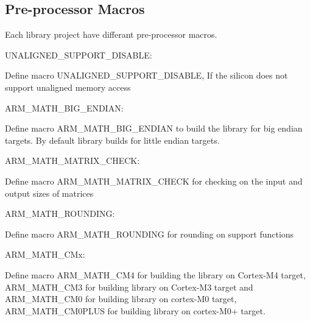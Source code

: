 \subsection*{Pre-\/processor Macros }

Each library project have differant pre-\/processor macros.


\begin{DoxyItemize}
\item U\+N\+A\+L\+I\+G\+N\+E\+D\+\_\+\+S\+U\+P\+P\+O\+R\+T\+\_\+\+D\+I\+S\+A\+B\+LE\+:
\end{DoxyItemize}

Define macro U\+N\+A\+L\+I\+G\+N\+E\+D\+\_\+\+S\+U\+P\+P\+O\+R\+T\+\_\+\+D\+I\+S\+A\+B\+LE, If the silicon does not support unaligned memory access


\begin{DoxyItemize}
\item A\+R\+M\+\_\+\+M\+A\+T\+H\+\_\+\+B\+I\+G\+\_\+\+E\+N\+D\+I\+AN\+:
\end{DoxyItemize}

Define macro A\+R\+M\+\_\+\+M\+A\+T\+H\+\_\+\+B\+I\+G\+\_\+\+E\+N\+D\+I\+AN to build the library for big endian targets. By default library builds for little endian targets.


\begin{DoxyItemize}
\item A\+R\+M\+\_\+\+M\+A\+T\+H\+\_\+\+M\+A\+T\+R\+I\+X\+\_\+\+C\+H\+E\+CK\+:
\end{DoxyItemize}

Define macro A\+R\+M\+\_\+\+M\+A\+T\+H\+\_\+\+M\+A\+T\+R\+I\+X\+\_\+\+C\+H\+E\+CK for checking on the input and output sizes of matrices


\begin{DoxyItemize}
\item A\+R\+M\+\_\+\+M\+A\+T\+H\+\_\+\+R\+O\+U\+N\+D\+I\+NG\+:
\end{DoxyItemize}

Define macro A\+R\+M\+\_\+\+M\+A\+T\+H\+\_\+\+R\+O\+U\+N\+D\+I\+NG for rounding on support functions


\begin{DoxyItemize}
\item A\+R\+M\+\_\+\+M\+A\+T\+H\+\_\+\+C\+Mx\+:
\end{DoxyItemize}

Define macro A\+R\+M\+\_\+\+M\+A\+T\+H\+\_\+\+C\+M4 for building the library on Cortex-\/\+M4 target, A\+R\+M\+\_\+\+M\+A\+T\+H\+\_\+\+C\+M3 for building library on Cortex-\/\+M3 target and A\+R\+M\+\_\+\+M\+A\+T\+H\+\_\+\+C\+M0 for building library on cortex-\/\+M0 target, A\+R\+M\+\_\+\+M\+A\+T\+H\+\_\+\+C\+M0\+P\+L\+US for building library on cortex-\/\+M0+ target.


